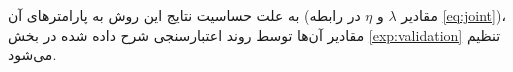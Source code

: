 به علت حساسیت نتایج این روش به پارامترهای آن  (مقادیر  $\lambda$ و $\eta$ در رابطه \eqref{eq:joint})، مقادیر آن‌ها توسط روند اعتبارسنجی شرح داده شده در بخش
\ref{exp:validation}
تنظیم می‌شود.

